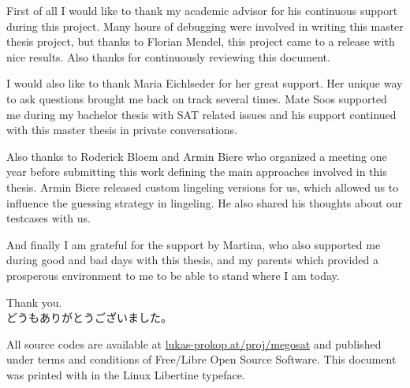\documentclass[11pt,a4paper,final,oneside]{book}
\numberwithin{theorem}{chapter}
\numberwithin{defi}{chapter}
\numberwithin{prop}{chapter}
\begin{document}


\begin{acknowledgements}%
  \parskip5pt
  First of all I would like to thank my academic advisor for his continuous support
  during this project. Many hours of debugging were involved in writing this
  master thesis project, but thanks to Florian Mendel, this project came to a release
  with nice results. Also thanks for continuously reviewing this document.

  I would also like to thank Maria Eichlseder for her great support. Her unique
  way to ask questions brought me back on track several times.
  Mate Soos supported me during my bachelor thesis with SAT related issues
  and his support continued with this master thesis in private conversations.

  Also thanks to Roderick Bloem and Armin Biere who organized a meeting
  one year before submitting this work defining the main approaches involved
  in this thesis. Armin Biere released custom lingeling versions for us,
  which allowed us to influence the guessing strategy in lingeling.
  He also shared his thoughts about our testcases with us.

  And finally I am grateful for the support by Martina,
  who also supported me during good and bad days with this thesis,
  and my parents which provided a prosperous environment to me
  to be able to stand where I am today.

  Thank you. \\
  \indent どうもありがとうございました。
\end{acknowledgements}

All source codes are available at \href{http://lukas-prokop.at/proj/megosat}{lukas-prokop.at/proj/megosat}
and published under terms and conditions of Free/Libre Open Source Software.
This document was printed with \LuaLaTeX{} in the Linux Libertine typeface.

\tableofcontents
\mainmatter











\backmatter
\printbibliography
\end{document}
